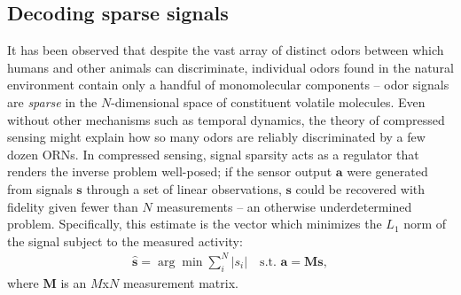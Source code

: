 \documentclass[9pt,twocolumn,twoside]{pnas-new}
\begin{document}
\subsection*{Decoding sparse signals}
It has been observed that despite the vast array of distinct odors between which humans and other animals can discriminate, individual odors found in the natural environment contain only a handful of monomolecular components -- odor signals are \textit{sparse} in the $N$-dimensional space of constituent volatile molecules. Even without other mechanisms such as temporal dynamics, the theory of compressed sensing might explain how so many odors are reliably discriminated by a few dozen ORNs. In compressed sensing, signal sparsity acts as a regulator that renders the inverse problem well-posed; if the sensor output $\mathbf a$ were generated from signals $\mathbf s$ through a set of linear observations, $\mathbf s$ could be recovered with fidelity given fewer than $N$ measurements -- an otherwise underdetermined problem. %
Specifically, this estimate is the vector which minimizes the $L_1$ norm of the signal subject to the measured activity:
\begin{align}
\hat {\mathbf s} = \arg \min \sum_i^N |s_i| \quad \text {s.t.  } \mathbf a = \mathbf M \mathbf s,
\label{eq:compressed_sensing_formulation}
\end{align}
where $\mathbf M$ is an $M$x$N$ measurement matrix.
\end{document}
